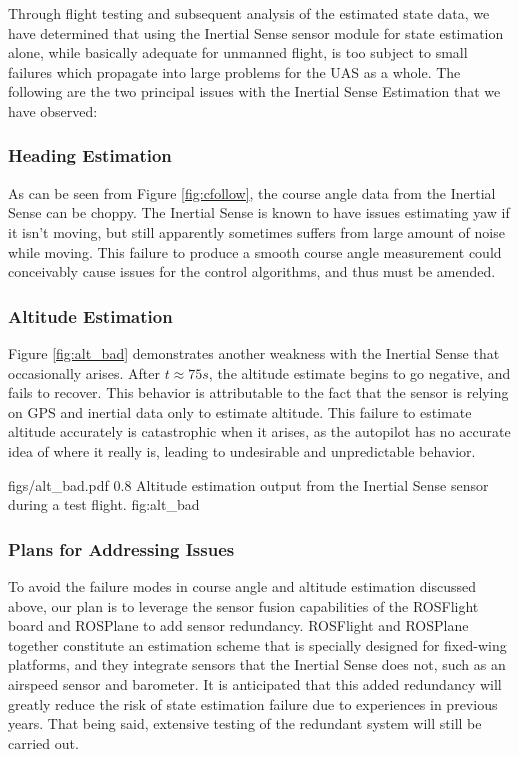 \documentclass[]{auvsi_doc}
\begin{document}
Through flight testing and subsequent analysis of the estimated state data, we have determined that using the Inertial Sense sensor module for state estimation alone, while basically adequate for unmanned flight, is too subject to small failures which propagate into large problems for the UAS as a whole. The following are the two principal issues with the Inertial Sense Estimation that we have observed:

\subsubsection{Heading Estimation}

As can be seen from Figure \ref{fig:cfollow}, the course angle data from the Inertial Sense can be choppy. The Inertial Sense is known to have issues estimating yaw if it isn't moving, but still apparently sometimes suffers from large amount of noise  while moving. This failure to produce a smooth course angle measurement could conceivably cause issues for the control algorithms, and thus must be amended.

\subsubsection{Altitude Estimation}

Figure \ref{fig:alt_bad} demonstrates another weakness with the Inertial Sense that occasionally arises. After $t \approx 75s$, the altitude estimate begins to go negative, and fails to recover. This behavior is attributable to the fact that the sensor is relying on GPS and inertial data only to estimate altitude. This failure to estimate altitude accurately is catastrophic when it arises, as the autopilot has no accurate idea of where it really is, leading to undesirable and unpredictable behavior.

\AUVSIFigure
{figs/alt_bad.pdf}
{0.8\textwidth}
{Altitude estimation output from the Inertial Sense sensor during a test flight.}
{fig:alt_bad}

\subsubsection{Plans for Addressing Issues}

To avoid the failure modes in course angle and altitude estimation discussed above, our plan is to leverage the sensor fusion capabilities of the ROSFlight board and ROSPlane to add sensor redundancy. ROSFlight and ROSPlane together constitute an estimation scheme that is specially designed for fixed-wing platforms, and they integrate sensors that the Inertial Sense does not, such as an airspeed sensor and barometer. It is anticipated that this added redundancy will greatly reduce the risk of state estimation failure due to experiences in previous years. That being said, extensive testing of the redundant system will still be carried out.
\end{document}
